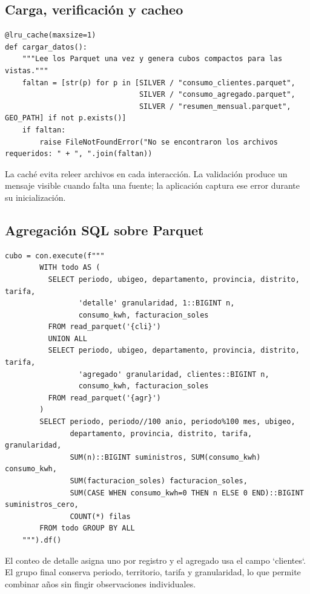 \documentclass[11pt,a4paper]{article}
\begin{document}
\subsection{Carga, verificación y cacheo}
\begin{lstlisting}[caption={dashboard/data\_loader.py — cargar\_datos, cache y archivos requeridos}]
@lru_cache(maxsize=1)
def cargar_datos():
    """Lee los Parquet una vez y genera cubos compactos para las vistas."""
    faltan = [str(p) for p in [SILVER / "consumo_clientes.parquet",
                               SILVER / "consumo_agregado.parquet",
                               SILVER / "resumen_mensual.parquet", GEO_PATH] if not p.exists()]
    if faltan:
        raise FileNotFoundError("No se encontraron los archivos requeridos: " + ", ".join(faltan))
\end{lstlisting}
La caché evita releer archivos en cada interacción. La validación produce un mensaje visible cuando falta una fuente; la aplicación captura ese error durante su inicialización.

\subsection{Agregación SQL sobre Parquet}
\begin{lstlisting}[caption={dashboard/data\_loader.py — cargar\_datos, cubo DuckDB}]
    cubo = con.execute(f"""
        WITH todo AS (
          SELECT periodo, ubigeo, departamento, provincia, distrito, tarifa,
                 'detalle' granularidad, 1::BIGINT n,
                 consumo_kwh, facturacion_soles
          FROM read_parquet('{cli}')
          UNION ALL
          SELECT periodo, ubigeo, departamento, provincia, distrito, tarifa,
                 'agregado' granularidad, clientes::BIGINT n,
                 consumo_kwh, facturacion_soles
          FROM read_parquet('{agr}')
        )
        SELECT periodo, periodo//100 anio, periodo%100 mes, ubigeo,
               departamento, provincia, distrito, tarifa, granularidad,
               SUM(n)::BIGINT suministros, SUM(consumo_kwh) consumo_kwh,
               SUM(facturacion_soles) facturacion_soles,
               SUM(CASE WHEN consumo_kwh=0 THEN n ELSE 0 END)::BIGINT suministros_cero,
               COUNT(*) filas
        FROM todo GROUP BY ALL
    """).df()
\end{lstlisting}
El conteo de detalle asigna uno por registro y el agregado usa el campo `clientes`. El grupo final conserva periodo, territorio, tarifa y granularidad, lo que permite combinar años sin fingir observaciones individuales.
\end{document}
